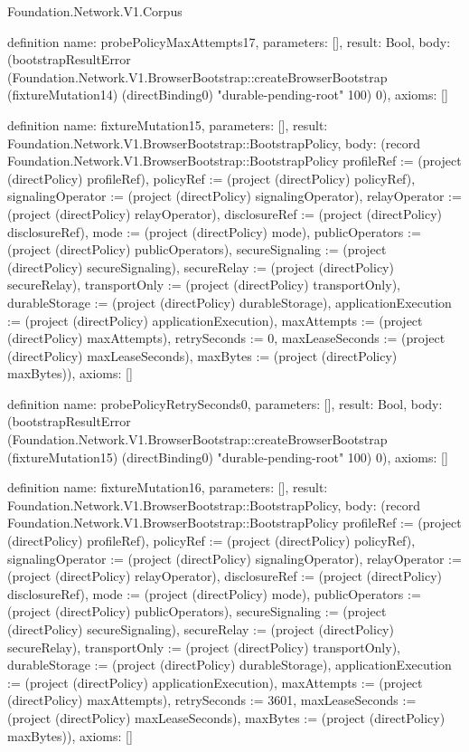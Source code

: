 \begin{lexlean}{Foundation.Network.V1.Corpus}
\begin{semanticmodule}
definition{
  name: probePolicyMaxAttempts17,
  parameters: [],
  result: Bool,
  body: (bootstrapResultError (Foundation.Network.V1.BrowserBootstrap::createBrowserBootstrap (fixtureMutation14) (directBinding0) "durable-pending-root" 100) 0),
  axioms: []
}

definition{
  name: fixtureMutation15,
  parameters: [],
  result: Foundation.Network.V1.BrowserBootstrap::BootstrapPolicy,
  body: (record Foundation.Network.V1.BrowserBootstrap::BootstrapPolicy {profileRef := (project (directPolicy) profileRef), policyRef := (project (directPolicy) policyRef), signalingOperator := (project (directPolicy) signalingOperator), relayOperator := (project (directPolicy) relayOperator), disclosureRef := (project (directPolicy) disclosureRef), mode := (project (directPolicy) mode), publicOperators := (project (directPolicy) publicOperators), secureSignaling := (project (directPolicy) secureSignaling), secureRelay := (project (directPolicy) secureRelay), transportOnly := (project (directPolicy) transportOnly), durableStorage := (project (directPolicy) durableStorage), applicationExecution := (project (directPolicy) applicationExecution), maxAttempts := (project (directPolicy) maxAttempts), retrySeconds := 0, maxLeaseSeconds := (project (directPolicy) maxLeaseSeconds), maxBytes := (project (directPolicy) maxBytes)}),
  axioms: []
}

definition{
  name: probePolicyRetrySeconds0,
  parameters: [],
  result: Bool,
  body: (bootstrapResultError (Foundation.Network.V1.BrowserBootstrap::createBrowserBootstrap (fixtureMutation15) (directBinding0) "durable-pending-root" 100) 0),
  axioms: []
}

definition{
  name: fixtureMutation16,
  parameters: [],
  result: Foundation.Network.V1.BrowserBootstrap::BootstrapPolicy,
  body: (record Foundation.Network.V1.BrowserBootstrap::BootstrapPolicy {profileRef := (project (directPolicy) profileRef), policyRef := (project (directPolicy) policyRef), signalingOperator := (project (directPolicy) signalingOperator), relayOperator := (project (directPolicy) relayOperator), disclosureRef := (project (directPolicy) disclosureRef), mode := (project (directPolicy) mode), publicOperators := (project (directPolicy) publicOperators), secureSignaling := (project (directPolicy) secureSignaling), secureRelay := (project (directPolicy) secureRelay), transportOnly := (project (directPolicy) transportOnly), durableStorage := (project (directPolicy) durableStorage), applicationExecution := (project (directPolicy) applicationExecution), maxAttempts := (project (directPolicy) maxAttempts), retrySeconds := 3601, maxLeaseSeconds := (project (directPolicy) maxLeaseSeconds), maxBytes := (project (directPolicy) maxBytes)}),
  axioms: []
}


\end{semanticmodule}
\end{lexlean}

